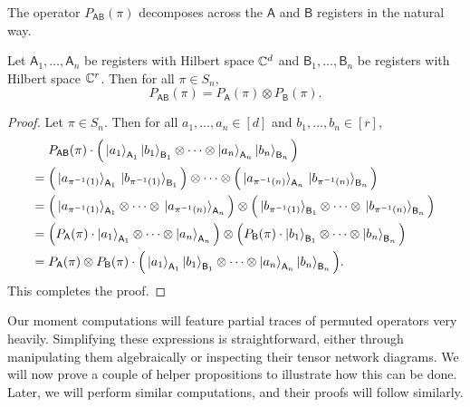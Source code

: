 \documentclass{article}
\newcommand{\reg}[1]{\mathsf{#1}}
\begin{document}
The operator $P_{\reg{A}\reg{B}}(\pi)$ decomposes across the $\reg{A}$ and $\reg{B}$ registers in the natural way.
\begin{proposition}\label{prop:permute-factor}
Let $\reg{A}_1, \ldots, \reg{A}_n$ be registers with Hilbert space $\mathbb C^d$
and $\reg{B}_1, \ldots, \reg{B}_n$ be registers with Hilbert space $\mathbb C^r$.
Then for all $\pi \in S_n$,
\begin{equation*}
    P_{\reg{A}\reg{B}}(\pi) = P_{\reg{A}}(\pi) \otimes P_{\reg{B}}(\pi).
\end{equation*}
\end{proposition}
\begin{proof}
    Let $\pi \in S_n$. Then for all $a_1, \ldots, a_n \in [d]$ and $b_1, \ldots, b_n \in [r]$, 
    \begin{align*}
    &P_{\reg{A}\reg{B}}(\pi)
        \cdot \Big(\ket{a_1}_{\reg{A}_1}\ket{b_1}_{\reg{B}_1} \otimes \cdots \otimes \ket{a_n}_{\reg{A}_n} \ket{b_n}_{\reg{B}_n}\Big)\\
        ={}& \Big(\ket*{a_{\pi^{-1}(1)}}_{\reg{A}_1}\ket*{b_{\pi^{-1}(1)}}_{\reg{B}_1}\Big) \otimes \cdots \otimes \Big(\ket*{a_{\pi^{-1}(n)}}_{\reg{A}_n} \ket*{b_{\pi^{-1}(n)}}_{\reg{B}_n}\Big)\\
        ={}& \Big(\ket*{a_{\pi^{-1}(1)}}_{\reg{A}_1} \otimes \cdots \otimes \ket*{a_{\pi^{-1}(n)}}_{\reg{A}_n}\Big) \otimes \Big(\ket*{b_{\pi^{-1}(1)}}_{\reg{B}_1} \otimes \cdots \otimes  \ket*{b_{\pi^{-1}(n)}}_{\reg{B}_n}\Big)\\
        ={}& \Big(P_{\reg{A}}(\pi) \cdot \ket{a_1}_{\reg{A}_1} \otimes \cdots \otimes \ket{a_n}_{\reg{A}_n}\Big) \otimes \Big(P_{\reg{B}}(\pi) \cdot \ket{b_1}_{\reg{B}_1} \otimes \cdots \otimes \ket{b_n}_{\reg{B}_n}\Big)\\
        ={}& P_{\reg{A}}(\pi) \otimes P_{\reg{B}}(\pi)
        \cdot \Big(\ket{a_1}_{\reg{A}_1}\ket{b_1}_{\reg{B}_1} \otimes \cdots \otimes \ket{a_n}_{\reg{A}_n} \ket{b_n}_{\reg{B}_n}\Big).
    \end{align*}
    This completes the proof.
\end{proof}

Our moment computations will feature partial traces of permuted operators very heavily.
Simplifying these expressions is straightforward, either through manipulating them algebraically or inspecting their tensor network diagrams.
We will now prove a couple of helper propositions to illustrate how this can be done.
Later, we will perform similar computations, and their proofs will follow similarly.
\end{document}
